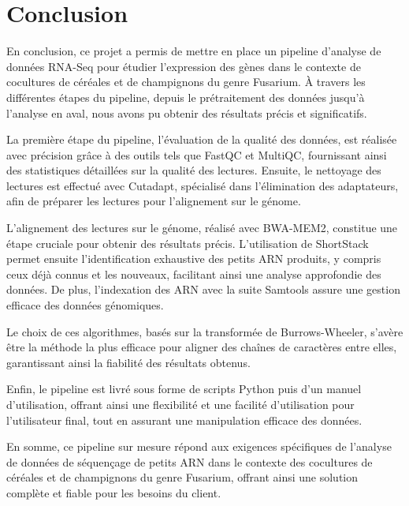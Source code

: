 \chapter*{Conclusion}


En conclusion, ce projet a permis de mettre en place un pipeline d'analyse de données RNA-Seq pour étudier l'expression des gènes dans le contexte de cocultures de céréales et de champignons du genre Fusarium. À travers les différentes étapes du pipeline, depuis le prétraitement des données jusqu'à l'analyse en aval, nous avons pu obtenir des résultats précis et significatifs.\newline
    
La première étape du pipeline, l'évaluation de la qualité des données, est réalisée avec précision grâce à des outils tels que FastQC et MultiQC, fournissant ainsi des statistiques détaillées sur la qualité des lectures. Ensuite, le nettoyage des lectures est effectué avec Cutadapt, spécialisé dans l'élimination des adaptateurs, afin de préparer les lectures pour l'alignement sur le génome.\newline
    
L'alignement des lectures sur le génome, réalisé avec BWA-MEM2, constitue une étape cruciale pour obtenir des résultats précis. L'utilisation de ShortStack permet ensuite l'identification exhaustive des petits ARN produits, y compris ceux déjà connus et les nouveaux, facilitant ainsi une analyse approfondie des données. De plus, l'indexation des ARN avec la suite Samtools assure une gestion efficace des données génomiques.\newline
    
Le choix de ces algorithmes, basés sur la transformée de Burrows-Wheeler, s'avère être la méthode la plus efficace pour aligner des chaînes de caractères entre elles, garantissant ainsi la fiabilité des résultats obtenus.\newline
    
Enfin, le pipeline est livré sous forme de scripts Python puis d'un manuel d'utilisation, offrant ainsi une flexibilité et une facilité d'utilisation pour l'utilisateur final, tout en assurant une manipulation efficace des données.\newline
    
En somme, ce pipeline sur mesure répond aux exigences spécifiques de l'analyse de données de séquençage de petits ARN dans le contexte des cocultures de céréales et de champignons du genre Fusarium, offrant ainsi une solution complète et fiable pour les besoins du client.

